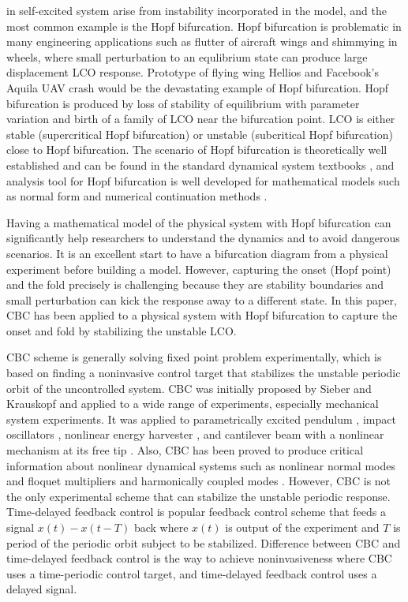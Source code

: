 \documentclass[openacc]{rsproca_new}%
\begin{document}
\noindent in self-excited system arise from instability incorporated in the model, and the most common example is the Hopf bifurcation. Hopf bifurcation is problematic in many engineering applications such as flutter of aircraft wings and shimmying in wheels, where small perturbation to an equlibrium state can produce large displacement LCO response. Prototype of flying wing Hellios \cite{noll2004investigation} and Facebook's Aquila UAV crash would be the devastating example of Hopf bifurcation. Hopf bifurcation is produced by loss of stability of equilibrium with parameter variation and birth of a family of LCO near the bifurcation point. LCO is either stable (supercritical Hopf bifurcation) or unstable (subcritical Hopf bifurcation) close to Hopf bifurcation. The scenario of Hopf bifurcation is theoretically well established and can be found in the standard dynamical system textbooks \cite{kuznetsov2013elements}, and analysis tool for Hopf bifurcation is well developed for mathematical models such as normal form \cite{yu2002simplest,ashwin1995numerical} and numerical continuation methods \cite{doedel2000auto2000,dankowicz2013recipes}.

Having a mathematical model of the physical system with Hopf bifurcation can significantly help researchers to understand the dynamics and to avoid dangerous scenarios.  It is an excellent start to have a bifurcation diagram from a physical experiment before building a model. However, capturing the onset (Hopf point) and the fold precisely is challenging because they are stability boundaries and small perturbation can kick the response away to a different state. In this paper, CBC has been applied to a physical system with Hopf bifurcation to capture the onset and fold by stabilizing the unstable LCO.

CBC scheme is generally solving fixed point problem experimentally, which is based on finding a noninvasive control target that stabilizes the unstable periodic orbit of the uncontrolled system. CBC was initially proposed by Sieber and Krauskopf \cite{sieber2008control} and applied to a wide range of experiments, especially mechanical system experiments. It was applied to parametrically excited pendulum \cite{sieber2011control}, impact oscillators \cite{bureau2013experimental,bureau2014experimental}, nonlinear energy harvester \cite{barton2013systematic,barton2011numerical}
, and cantilever beam with a nonlinear mechanism at its free tip \cite{renson2019application}. Also, CBC has been proved to produce critical information about nonlinear dynamical systems such as nonlinear normal modes \cite{renson2016robust,renson2016experimental} and floquet multipliers \cite{barton2017control} and harmonically coupled modes \cite{renson2019application}. However, CBC is not the only experimental scheme that can stabilize the unstable periodic response. Time-delayed feedback control \cite{pyragas2006delayed,sieber2016generic} is popular feedback control scheme that feeds a signal $x(t)-x(t-T)$ back where $x(t)$ is output of the experiment and $T$ is period of the periodic orbit subject to be stabilized. Difference between CBC and time-delayed feedback control is the way to achieve noninvasiveness where CBC uses a time-periodic control target, and time-delayed feedback control uses a delayed signal.
\end{document}
